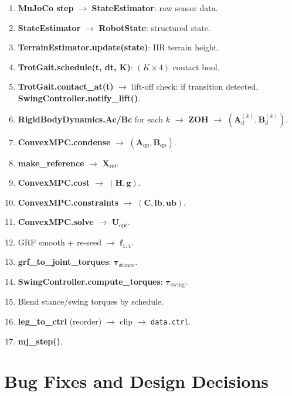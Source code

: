 \documentclass[12pt,a4paper]{report}
\newcommand{\vect}[1]{\bm{#1}}
\newcommand{\mat}[1]{\mathbf{#1}}
\begin{document}
\begin{enumerate}
    \item \textbf{MuJoCo step} $\to$ \textbf{StateEstimator}: raw sensor data.
    \item \textbf{StateEstimator} $\to$ \textbf{RobotState}: structured state.
    \item \textbf{TerrainEstimator.update(state)}: IIR terrain height.
    \item \textbf{TrotGait.schedule(t, dt, K)}: $(K\times4)$ contact bool.
    \item \textbf{TrotGait.contact\_at(t)} $\to$ lift-off check:
          if transition detected, \textbf{SwingController.notify\_lift()}.
    \item \textbf{RigidBodyDynamics.Ac/Bc} for each $k$ $\to$ \textbf{ZOH} $\to$
          $(\mat{A}_d^{(k)}, \mat{B}_d^{(k)})$.
    \item \textbf{ConvexMPC.condense} $\to$ $(\mat{A}_\text{qp}, \mat{B}_\text{qp})$.
    \item \textbf{make\_reference} $\to$ $\mat{X}_\text{ref}$.
    \item \textbf{ConvexMPC.cost} $\to$ $(\mat{H}, \vect{g})$.
    \item \textbf{ConvexMPC.constraints} $\to$ $(\mat{C}, \vect{lb}, \vect{ub})$.
    \item \textbf{ConvexMPC.solve} $\to$ $\mat{U}_\text{opt}$.
    \item GRF smooth + re-seed $\to$ $\vect{f}_{1:4}$.
    \item \textbf{grf\_to\_joint\_torques}: $\vect{\tau}_\text{stance}$.
    \item \textbf{SwingController.compute\_torques}: $\vect{\tau}_\text{swing}$.
    \item Blend stance/swing torques by schedule.
    \item \textbf{leg\_to\_ctrl} (reorder) $\to$ clip $\to$ \texttt{data.ctrl}.
    \item \textbf{mj\_step()}.
\end{enumerate}

\chapter{Bug Fixes and Design Decisions}
\end{document}
